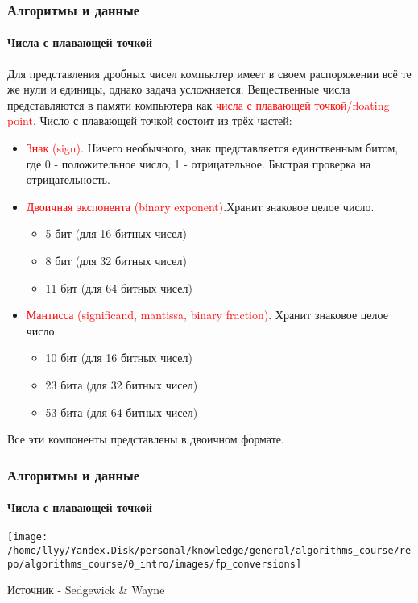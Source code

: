 \documentclass[aspectratio=169]{beamer}
\begin{document}
\begin{frame}
\frametitle{Алгоритмы и данные}
\framesubtitle{Числа с плавающей точкой}
\justifying
\small
Для представления дробных чисел компьютер имеет в своем распоряжении всё те же нули и единицы, однако задача усложняется.
Вещественные числа представляются в памяти компьютера как \textcolor{red}{числа с плавающей точкой/floating point}.\newline
Число с плавающей точкой состоит из трёх частей:
\begin{itemize}
\item{\textcolor{red}{Знак (sign)}. Ничего необычного, знак представляется единственным битом, где 0 - положительное число, 1 - отрицательное. Быстрая проверка на отрицательность.}
\item{\textcolor{red}{Двоичная экспонента (binary exponent)}.Хранит знаковое целое число.}
\begin{itemize}
\item{5 бит (для 16 битных чисел)}
\item{8 бит (для 32 битных чисел)}
\item{11 бит (для 64 битных чисел)}
\end{itemize}
\item{\textcolor{red}{Мантисса (significand, mantissa, binary fraction)}. Хранит знаковое целое число.}
\begin{itemize}
\item{10 бит (для 16 битных чисел)}
\item{23 бита (для 32 битных чисел)}
\item{53 бита (для 64 битных чисел)}
\end{itemize}
\end{itemize}

Все эти компоненты представлены в двоичном формате.
\end{frame}

\begin{frame}
\frametitle{Алгоритмы и данные}
\framesubtitle{Числа с плавающей точкой}
\justifying
\small
\centering
\texttt{[image: /home/llyy/Yandex.Disk/personal/knowledge/general/algorithms\_course/repo/algorithms\_course/0\_intro/images/fp\_conversions]}

\tiny Источник - Sedgewick \& Wayne 
\end{frame}
\end{document}
